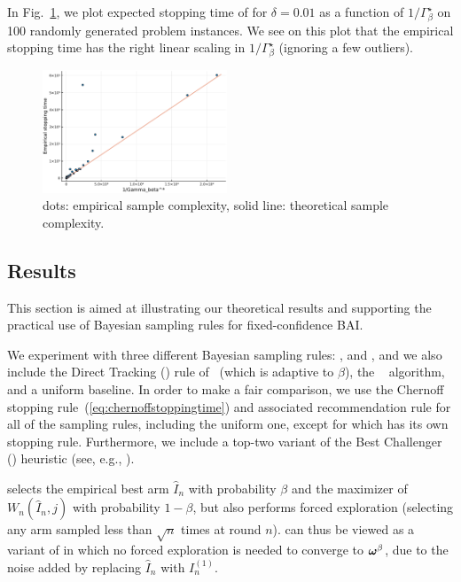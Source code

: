 In Fig.~\ref{fig:t3c.hardness}, we plot expected stopping time of \TCC for $\delta = 0.01$ as a function of $1/\Gamma_\beta^\star$ on 100 randomly generated problem instances. We see on this plot that the empirical stopping time has the right linear scaling in $1/\Gamma_\beta^\star$ (ignoring a few outliers).

\begin{figure}[ht]
    \centering
    \includegraphics[width=0.49\textwidth]{Chapter3/img/hardness.pdf}
    \caption{dots: empirical sample complexity, solid line: theoretical sample complexity.}
    \label{fig:t3c.hardness}
\end{figure}

\subsection{Results}\label{sec:t3c.experiments.results}
This section is aimed at illustrating our theoretical results and supporting the practical use of Bayesian sampling rules for fixed-confidence BAI.   %

We experiment with three different Bayesian sampling rules: \TCC, \TTTS and \TTEI, and we also include the Direct Tracking (\DT) rule of~\cite{garivier2016tracknstop} (which is adaptive to $\beta$), the \UGapE~\citep{gabillon2012ugape} algorithm, and a uniform baseline. In order to make a fair comparison, we use the Chernoff stopping rule~(\ref{eq:chernoffstoppingtime}) and associated recommendation rule for all of the sampling rules, including the uniform one, except for \UGapE which has its own stopping rule. Furthermore, we include a top-two variant of the Best Challenger (\BC) heuristic (see, e.g., \citealp{menard2019lma}). 

\BC selects the empirical best arm $\hat{I}_n$ with probability $\beta$ and the maximizer of $W_n(\hat{I}_n,j)$ with probability $1-\beta$, but also performs forced exploration (selecting any arm sampled less than $\sqrt{n}$ times at round $n$). \TCC can thus be viewed as a variant of \BC in which no forced exploration is needed to converge to ${\boldsymbol \omega}^\beta$, due to the noise added by replacing $\hat{I}_n$ with $I_n^{(1)}$.

